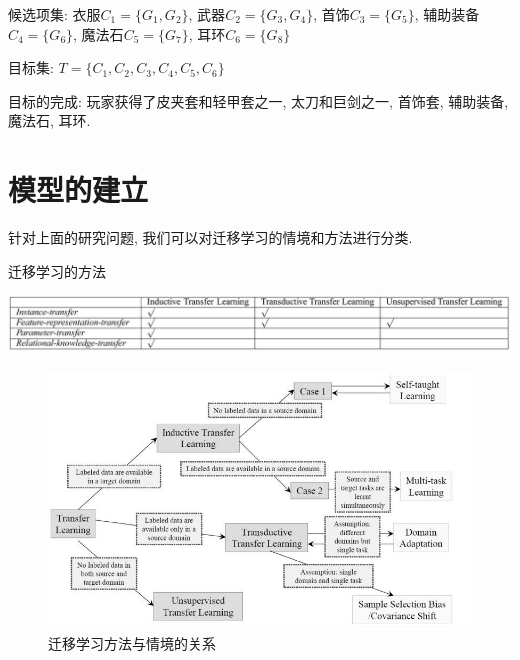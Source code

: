 \documentclass[10pt,journal,compsoc]{IEEEtran}
\begin{document}
候选项集: 衣服$C_1=\{G_1, G_2\}$, 武器$C_2=\{G_3, G_4\}$, 首饰$C_3=\{G_5\}$, 辅助装备$C_4=\{G_6\}$, 魔法石$C_5=\{G_7\}$, 耳环$C_6=\{G_8\}$

目标集: $T=\{C_1, C_2, C_3, C_4, C_5, C_6\}$

目标的完成: 玩家获得了皮夹套和轻甲套之一, 太刀和巨剑之一, 首饰套, 辅助装备, 魔法石, 耳环. 


\section{模型的建立}

针对上面的研究问题, 我们可以对迁移学习的情境和方法进行分类. 

\begin{table}[!ht]
\centering
\caption{迁移学习的方法}
\label{tab:survey_method}
\includegraphics[width=40pc]{img/survey_tab3.jpg}
\end{table}

\begin{figure}[!ht]
\centering
\includegraphics[width=30pc]{img/survey_fig1.jpg}
\caption{迁移学习方法与情境的关系}
\label{fig:survey_method}
\end{figure}
\end{document}
